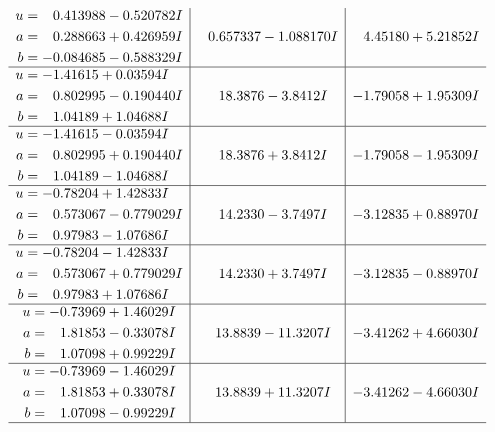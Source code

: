 \documentclass[1p]{elsarticle_modified}
\theoremstyle{definition}
\begin{document}
$$\begin{array}{c|c|c}
\begin{aligned}
u &= \phantom{-}0.413988 - 0.520782 I \\
a &= \phantom{-}0.288663 + 0.426959 I \\
b &= -0.084685 - 0.588329 I\end{aligned}
 & \phantom{-}0.657337 - 1.088170 I & \phantom{-}4.45180 + 5.21852 I \\ \hline\begin{aligned}
u &= -1.41615 + 0.03594 I \\
a &= \phantom{-}0.802995 - 0.190440 I \\
b &= \phantom{-}1.04189 + 1.04688 I\end{aligned}
 & \phantom{-}18.3876 - 3.8412 I & -1.79058 + 1.95309 I \\ \hline\begin{aligned}
u &= -1.41615 - 0.03594 I \\
a &= \phantom{-}0.802995 + 0.190440 I \\
b &= \phantom{-}1.04189 - 1.04688 I\end{aligned}
 & \phantom{-}18.3876 + 3.8412 I & -1.79058 - 1.95309 I \\ \hline\begin{aligned}
u &= -0.78204 + 1.42833 I \\
a &= \phantom{-}0.573067 - 0.779029 I \\
b &= \phantom{-}0.97983 - 1.07686 I\end{aligned}
 & \phantom{-}14.2330 - 3.7497 I & -3.12835 + 0.88970 I \\ \hline\begin{aligned}
u &= -0.78204 - 1.42833 I \\
a &= \phantom{-}0.573067 + 0.779029 I \\
b &= \phantom{-}0.97983 + 1.07686 I\end{aligned}
 & \phantom{-}14.2330 + 3.7497 I & -3.12835 - 0.88970 I \\ \hline\begin{aligned}
u &= -0.73969 + 1.46029 I \\
a &= \phantom{-}1.81853 - 0.33078 I \\
b &= \phantom{-}1.07098 + 0.99229 I\end{aligned}
 & \phantom{-}13.8839 - 11.3207 I & -3.41262 + 4.66030 I \\ \hline\begin{aligned}
u &= -0.73969 - 1.46029 I \\
a &= \phantom{-}1.81853 + 0.33078 I \\
b &= \phantom{-}1.07098 - 0.99229 I\end{aligned}
 & \phantom{-}13.8839 + 11.3207 I & -3.41262 - 4.66030 I\\
 \hline 
 \end{array}$$\newpage\newpage\renewcommand{\arraystretch}{1}
\end{document}
